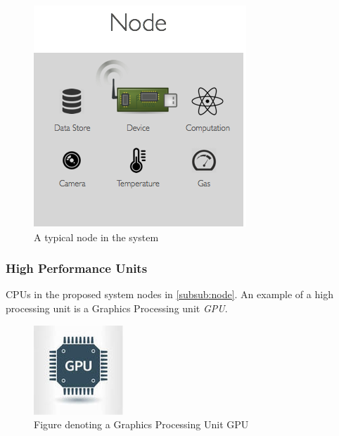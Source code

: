 \begin{figure}[H]
	\centering
	\includegraphics[scale=0.4]{images/node.png}
	\caption{A typical node in the system}
	\label{fig:node}
\end{figure}

\subsubsection{High Performance  Units }

CPUs in the proposed system nodes in \ref{subsub:node}. An example of a high processing unit is  a Graphics Processing unit \textit{GPU}.

\begin{figure}[H]
	\centering
	\includegraphics[scale=0.7]{images/gpu.png}
	\caption{Figure denoting a Graphics Processing Unit GPU}
	\label{fig:gpu}
\end{figure}

